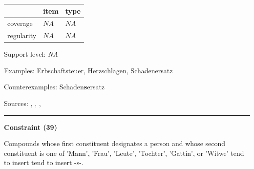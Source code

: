 \vspace{-0.25em}

\begin{table}[!ht]
\begin{center}
\setlength{\extrarowheight}{1pt}
\begin{tabularx}{\columnwidth}{|X|X|X|}
\hline
 & item & type \\
\hline
 coverage & $NA$ & $NA$ \\
\hline
 regularity & $NA$ & $NA$ \\
\hline
\end{tabularx}
\end{center}
\end{table}

\vspace{-1.35em}

\noindent
Support level: \textit{NA}

\vspace{0.3em}

\noindent
Examples: Erbschaft{\zeroLinker}steuer, Herz{\zeroLinker}schlagen, Schaden{\zeroLinker}ersatz

\noindent
Counterexamples: Schaden\textbf{s}ersatz

\vspace{0.3em}

\noindent
Sources: \citet[11]{nuebling_szczepaniak_2008}, \citet[98]{ortner_mueller-bollhagen_1991}, \citet[20]{schluecker_2023}, \citet[177]{wegener_2005}

\vspace{0.35em}
\hrule




\vspace{0.4em}

\begin{center}
\textbf{Constraint (39)}
\end{center}

\noindent
Compounds whose first constituent designates a person and whose second constituent is one of 'Mann', 'Frau', 'Leute', 'Tochter', 'Gattin', or 'Witwe' tend to insert tend to insert -s-.
\vspace{0.5em}


